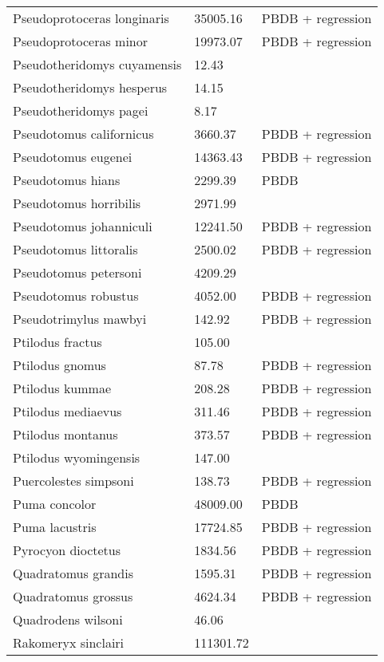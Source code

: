 \begin{center}
\begin{longtable}{p{} p{} p{} }
  Pseudoprotoceras longinaris & 35005.16 & PBDB + regression \\ 
  Pseudoprotoceras minor & 19973.07 & PBDB + regression \\ 
  Pseudotheridomys cuyamensis & 12.43 & \cite{Tomiya2013} \\ 
  Pseudotheridomys hesperus & 14.15 & \cite{Tomiya2013} \\ 
  Pseudotheridomys pagei & 8.17 & \cite{Tomiya2013} \\ 
  Pseudotomus californicus & 3660.37 & PBDB + regression \\ 
  Pseudotomus eugenei & 14363.43 & PBDB + regression \\ 
  Pseudotomus hians & 2299.39 & PBDB \\ 
  Pseudotomus horribilis & 2971.99 & \cite{Carraway2010} \\ 
  Pseudotomus johanniculi & 12241.50 & PBDB + regression \\ 
  Pseudotomus littoralis & 2500.02 & PBDB + regression \\ 
  Pseudotomus petersoni & 4209.29 & \cite{Carraway2010} \\ 
  Pseudotomus robustus & 4052.00 & PBDB + regression \\ 
  Pseudotrimylus mawbyi & 142.92 & PBDB + regression \\ 
  Ptilodus fractus & 105.00 & \cite{Wilson2012} \\ 
  Ptilodus gnomus & 87.78 & PBDB + regression \\ 
  Ptilodus kummae & 208.28 & PBDB + regression \\ 
  Ptilodus mediaevus & 311.46 & PBDB + regression \\ 
  Ptilodus montanus & 373.57 & PBDB + regression \\ 
  Ptilodus wyomingensis & 147.00 & \cite{Wilson2012} \\ 
  Puercolestes simpsoni & 138.73 & PBDB + regression \\ 
  Puma concolor & 48009.00 & PBDB \\ 
  Puma lacustris & 17724.85 & PBDB + regression \\ 
  Pyrocyon dioctetus & 1834.56 & PBDB + regression \\ 
  Quadratomus grandis & 1595.31 & PBDB + regression \\ 
  Quadratomus grossus & 4624.34 & PBDB + regression \\ 
  Quadrodens wilsoni & 46.06 & \cite{Tomiya2013} \\ 
  Rakomeryx sinclairi & 111301.72 & \cite{Tomiya2013} \\ 

\end{longtable}
\end{center}
